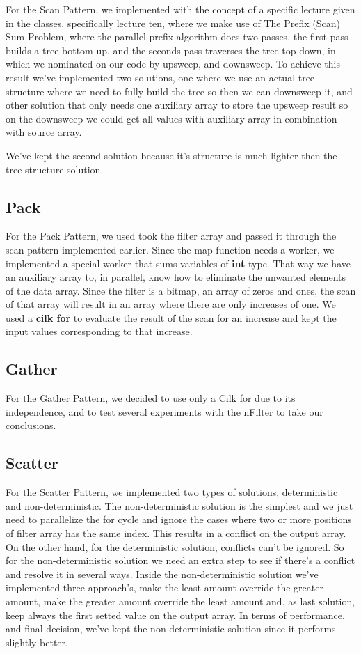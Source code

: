 \documentclass[10pt,journal,compsoc]{IEEEtran}
\begin{document}
For the Scan Pattern, we implemented with the concept of a specific lecture given in the classes, specifically lecture ten, where we make use of The Prefix (Scan) Sum Problem, where the parallel-prefix algorithm does two passes, the first pass builds a tree bottom-up, and the seconds pass traverses the tree top-down, in which we nominated on our code by upsweep, and downsweep.
To achieve this result we've implemented two solutions, one where we use an actual tree structure where we need to fully build the tree so then we can downsweep it, and other solution that only needs one auxiliary array to store the upsweep result so on the downsweep we could get all values with auxiliary array in combination with source array.

We've kept the second solution because it's structure is much lighter then the tree structure solution.

\subsection{Pack}

For the Pack Pattern, we used took the filter array and passed it through the scan pattern implemented earlier. Since the map function needs a worker, we implemented a special worker that sums variables of \textbf{int} type. That way we have an auxiliary array to, in parallel, know how to eliminate the unwanted elements of the data array. Since the filter is a bitmap, an array of zeros and ones, the scan of that array will result in an array where there are only increases of one. We used a \textbf{cilk for} to evaluate the result of the scan for an increase and kept the input values corresponding to that increase. 

\subsection{Gather}

For the Gather Pattern, we decided to use only a Cilk for due to its independence, and to test several experiments with the nFilter to take our conclusions.

\subsection{Scatter}

For the Scatter Pattern, we implemented two types of solutions, deterministic and non-deterministic. The non-deterministic solution is the simplest and we just need to parallelize the for cycle and ignore the cases where two or more positions of filter array has the same index. This results in a conflict on the output array. On the other hand, for the deterministic solution, conflicts can't be ignored. So for the non-deterministic solution we need an extra step to see if there's a conflict and resolve it in several ways. Inside the non-deterministic solution we've implemented three approach's, make the least amount override the greater amount, make the greater amount override the least amount and, as last solution, keep always the first setted value on the output array. In terms of performance, and final decision, we've kept the non-deterministic solution since it performs slightly better. 
\end{document}
